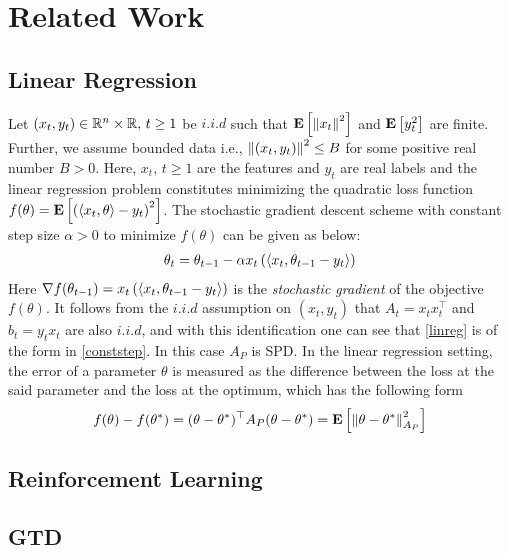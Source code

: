 \section{Related Work}
\subsection{Linear Regression}
Let $(x_t,y_t)\in \mathbb{R}^n\times \mathbb{R},\,t\geq 1$ be $i.i.d$ such that $\mathbf{E}\left[\left\| x_t\right\|^2\right]$ and $\mathbf{E}\left[y_t^2\right]$ are finite. Further, we assume bounded data i.e., $\left\| (x_t,y_t)\right\|^2\leq B$ for some positive real number $B>0$. Here, $x_t,\,t\geq 1$ are the features and $y_t$ are real labels and the linear regression problem constitutes minimizing the quadratic loss function $f(\theta)=\mathbf{E}\left[\left(\langle x_t,\theta\rangle-y_t\right)^2\right]$. The stochastic gradient descent scheme with constant step size $\alpha>0$ to minimize $f(\theta)$ can be given as below:
\begin{align}\label{linreg}
\theta_t=\theta_{t-1}-\alpha x_t\left(\langle x_t,\theta_{t-1} -y_t\rangle\right)
\end{align}
Here $\nabla f(\theta_{t-1})=x_t\left(\langle x_t,\theta_{t-1} -y_t\rangle\right)$ is the \emph{stochastic gradient} of the objective $f(\theta)$. It follows from the $i.i.d$ assumption on $(x_t,y_t)$ that $A_t=x_t x_t^\top$ and $b_t=y_t x_t$ are also $i.i.d$, and with this identification one can see that \eqref{linreg} is of the form in \eqref{conststep}. In this case $A_P$ is SPD.
In the linear regression setting, the error of a parameter $\theta$ is measured as the difference between the loss at the said parameter and the loss at the optimum, which has the following form
\begin{align*}
f(\theta)-f(\theta^*)=(\theta-\theta^*)^\top A_P (\theta-\theta^*)=\mathbf{E}\left[\left\| \theta-\theta^*\right\|^2_{A_P}\right]
\end{align*}

\subsection{Reinforcement Learning}
\subsection{GTD}
